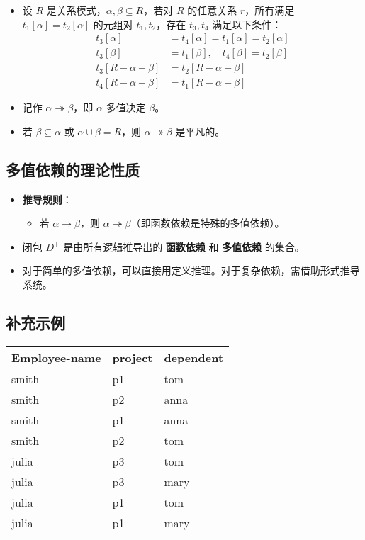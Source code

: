 \begin{itemize}
    \item 设 $R$ 是关系模式，$\alpha, \beta \subseteq R$，若对 $R$ 的任意关系 $r$，所有满足 $t_1[\alpha] = t_2[\alpha]$ 的元组对 $t_1,t_2$，存在 $t_3,t_4$ 满足以下条件：
    \begin{align*}
        t_3[\alpha] &= t_4[\alpha] = t_1[\alpha] = t_2[\alpha] \\
        t_3[\beta] &= t_1[\beta],\quad t_4[\beta] = t_2[\beta] \\
        t_3[R-\alpha-\beta] &= t_2[R-\alpha-\beta] \\
        t_4[R-\alpha-\beta] &= t_1[R-\alpha-\beta]
    \end{align*}
    \item 记作 $\alpha \twoheadrightarrow \beta$，即 $\alpha$ 多值决定 $\beta$。
    \item 若 $\beta \subseteq \alpha$ 或 $\alpha \cup \beta = R$，则 $\alpha \twoheadrightarrow \beta$ 是平凡的。
\end{itemize}

\subsection{多值依赖的理论性质}

\begin{itemize}
    \item \textbf{推导规则}：
    \begin{itemize}
        \item 若 $\alpha \rightarrow \beta$，则 $\alpha \twoheadrightarrow \beta$（即函数依赖是特殊的多值依赖）。
    \end{itemize}
    \item 闭包 $D^+$ 是由所有逻辑推导出的 \textbf{函数依赖} 和 \textbf{多值依赖} 的集合。
    \item 对于简单的多值依赖，可以直接用定义推理。对于复杂依赖，需借助形式推导系统。
\end{itemize}

\subsection{补充示例}

\begin{center}
\begin{tabular}{|l|l|l|}
\hline
\textbf{Employee-name} & \textbf{project} & \textbf{dependent} \\
\hline
smith & p1 & tom \\
smith & p2 & anna \\
smith & p1 & anna \\
smith & p2 & tom \\
julia & p3 & tom \\
julia & p3 & mary \\
julia & p1 & tom \\
julia & p1 & mary \\
\hline
\end{tabular}
\end{center}

